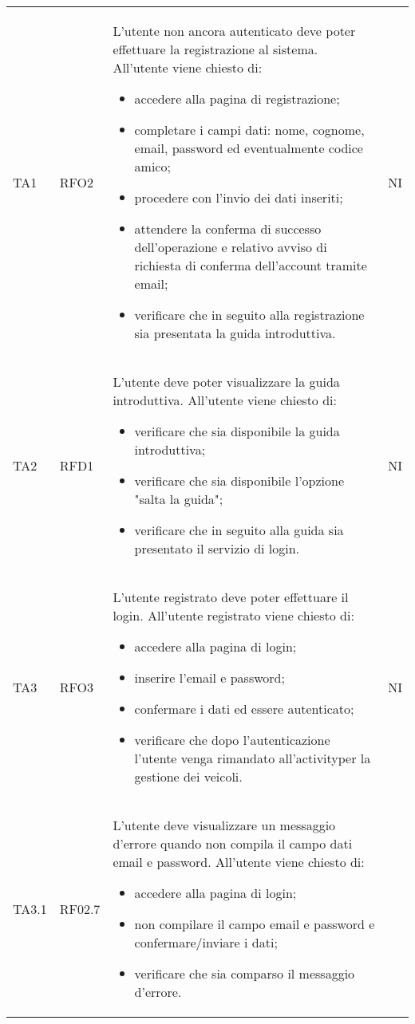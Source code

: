 \begin{longtable}{ >{\centering}p{} >{\centering}p{} >{\centering}p{}
			>{\centering}p{}}
		TA1	& RFO2 &	L'utente non ancora autenticato deve poter effettuare la registrazione al sistema. All'utente viene chiesto di:
		\begin{itemize}
			\item accedere alla pagina di registrazione;
			\item completare i campi dati: nome, cognome, email, password ed eventualmente codice amico;
			\item procedere con l'invio dei dati inseriti;
			\item attendere la conferma di successo dell'operazione e relativo avviso di richiesta di conferma dell'account tramite email;
			\item verificare che in seguito alla registrazione sia presentata la guida introduttiva.
		\end{itemize}	&	NI	\tabularnewline
		TA2	& RFD1 &	L'utente deve poter visualizzare la guida introduttiva. All'utente viene chiesto di:
		 \begin{itemize}
		 	\item verificare che sia disponibile la guida introduttiva;
		 	\item verificare che sia disponibile l'opzione "salta la guida";
		 	\item verificare che in seguito alla guida sia presentato il servizio di login. 
		 \end{itemize}	&	NI	\tabularnewline
		 TA3	& RFO3 & L'utente registrato deve poter effettuare il login. All'utente registrato viene chiesto di:
		 \begin{itemize}
		 	\item accedere alla pagina di login;
		 	\item inserire l'email e password;
		 	\item confermare i dati ed essere autenticato;
		 	\item verificare che dopo l'autenticazione l'utente venga rimandato all'activity\glosp per la gestione dei veicoli.
		 \end{itemize}	&	NI	\tabularnewline
		 TA3.1 & RF02.7	& L'utente deve visualizzare un messaggio d'errore quando non compila il campo dati email e password. All'utente viene chiesto di:
		 \begin{itemize}
		 	\item accedere alla pagina di login;
		 	\item non compilare il campo email e password e confermare/inviare i dati;
		 	\item verificare che sia comparso il messaggio d'errore.

\end{itemize}
\end{longtable}
